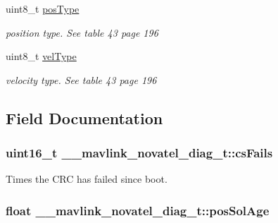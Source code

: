 \begin{DoxyCompactItemize}
uint8\+\_\+t \hyperlink{struct____mavlink__novatel__diag__t_aeba2cb0f37324ed79543b2f02ee6e962}{pos\+Type}
\begin{DoxyCompactList}\small\item\em position type. See table 43 page 196 \end{DoxyCompactList}\item 
uint8\+\_\+t \hyperlink{struct____mavlink__novatel__diag__t_ae7186cff4ff8cf73fcff1872b18bad56}{vel\+Type}
\begin{DoxyCompactList}\small\item\em velocity type. See table 43 page 196 \end{DoxyCompactList}\end{DoxyCompactItemize}


\subsection{Field Documentation}
\hypertarget{struct____mavlink__novatel__diag__t_a1c89c8ef0791eb0767fd6dba460317e7}{
\subsubsection[{cs\+Fails}]{\setlength{\rightskip}{0pt plus 5cm}uint16\+\_\+t \+\_\+\+\_\+mavlink\+\_\+novatel\+\_\+diag\+\_\+t\+::cs\+Fails}}\label{struct____mavlink__novatel__diag__t_a1c89c8ef0791eb0767fd6dba460317e7}


Times the C\+R\+C has failed since boot. 

\hypertarget{struct____mavlink__novatel__diag__t_a8686797075d1c2412aa4ce1dca081e02}{
\subsubsection[{pos\+Sol\+Age}]{\setlength{\rightskip}{0pt plus 5cm}float \+\_\+\+\_\+mavlink\+\_\+novatel\+\_\+diag\+\_\+t\+::pos\+Sol\+Age}}\label{struct____mavlink__novatel__diag__t_a8686797075d1c2412aa4ce1dca081e02}


